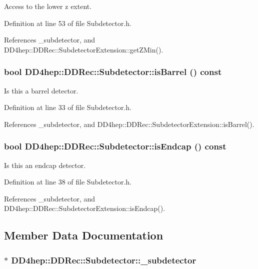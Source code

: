 Access to the lower z extent. 

Definition at line 53 of file Subdetector.h.

References \_\-subdetector, and DD4hep::DDRec::SubdetectorExtension::getZMin().\hypertarget{class_d_d4hep_1_1_d_d_rec_1_1_subdetector_a27cd4d214d135172ac3a499d435cfe79}{
\subsubsection[{isBarrel}]{\setlength{\rightskip}{0pt plus 5cm}bool DD4hep::DDRec::Subdetector::isBarrel () const}}
\label{class_d_d4hep_1_1_d_d_rec_1_1_subdetector_a27cd4d214d135172ac3a499d435cfe79}


Is this a barrel detector. 

Definition at line 33 of file Subdetector.h.

References \_\-subdetector, and DD4hep::DDRec::SubdetectorExtension::isBarrel().\hypertarget{class_d_d4hep_1_1_d_d_rec_1_1_subdetector_a1f41cf67deb67155ed65657328b317b5}{
\subsubsection[{isEndcap}]{\setlength{\rightskip}{0pt plus 5cm}bool DD4hep::DDRec::Subdetector::isEndcap () const}}
\label{class_d_d4hep_1_1_d_d_rec_1_1_subdetector_a1f41cf67deb67155ed65657328b317b5}


Is this an endcap detector. 

Definition at line 38 of file Subdetector.h.

References \_\-subdetector, and DD4hep::DDRec::SubdetectorExtension::isEndcap().

\subsection{Member Data Documentation}
\hypertarget{class_d_d4hep_1_1_d_d_rec_1_1_subdetector_a5caedab984b0c8d6810eae5b85d238b1}{
\subsubsection[{\_\-subdetector}]{$\ast$ {\bf DD4hep::DDRec::Subdetector::\_\-subdetector}}}
\label{class_d_d4hep_1_1_d_d_rec_1_1_subdetector_a5caedab984b0c8d6810eae5b85d238b1}


